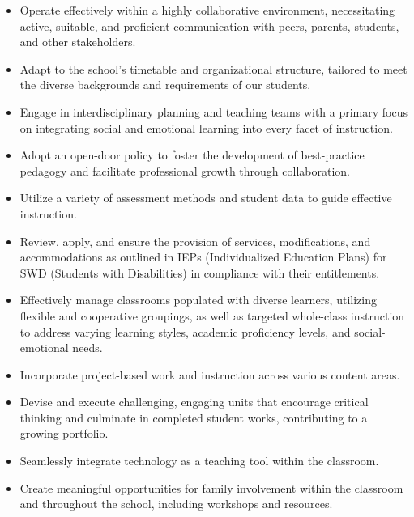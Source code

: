 \documentclass[11pt]{article}
\begin{document}
\begin{itemize}
\item Operate effectively within a highly collaborative environment, necessitating active, suitable, and proficient communication with peers, parents, students, and other stakeholders.

\item Adapt to the school’s timetable and organizational structure, tailored to meet the diverse backgrounds and requirements of our students.

\item Engage in interdisciplinary planning and teaching teams with a primary focus on integrating social and emotional learning into every facet of instruction.

\item Adopt an open-door policy to foster the development of best-practice pedagogy and facilitate professional growth through collaboration.

\item Utilize a variety of assessment methods and student data to guide effective instruction.

\item Review, apply, and ensure the provision of services, modifications, and accommodations as outlined in IEPs (Individualized Education Plans) for SWD (Students with Disabilities) in compliance with their entitlements.

\item Effectively manage classrooms populated with diverse learners, utilizing flexible and cooperative groupings, as well as targeted whole-class instruction to address varying learning styles, academic proficiency levels, and social-emotional needs.

\item Incorporate project-based work and instruction across various content areas.

\item Devise and execute challenging, engaging units that encourage critical thinking and culminate in completed student works, contributing to a growing portfolio.

\item Seamlessly integrate technology as a teaching tool within the classroom.

\item Create meaningful opportunities for family involvement within the classroom and throughout the school, including workshops and resources.


\end{itemize}
\end{document}
